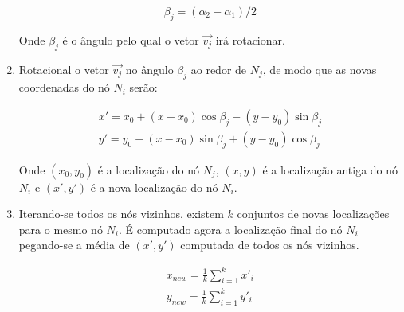 \begin{enumerate}
    \begin{equation*}
        \beta_j = (\alpha_2 - \alpha_1) / 2
    \end{equation*}

    Onde $\beta_j$ é o ângulo pelo qual o vetor $\vec{v_j}$ irá rotacionar.

    \item Rotacional o vetor $\vec{v_j}$ no ângulo $\beta_j$ ao redor de $N_j$, de modo que as novas coordenadas do nó $N_i$ serão:
    
    \begin{equation*}
    \begin{split}
        x' = x_0 + (x-x_0) \cos{\beta_j} - (y-y_0) \sin{\beta_j}\\
        y' = y_0 + (x-x_0) \sin{\beta_j} + (y-y_0) \cos{\beta_j}
    \end{split}
    \end{equation*}

    Onde $(x_0, y_0)$ é a localização do nó $N_j$, $(x,y)$ é a localização antiga do nó $N_i$ e $(x', y')$ é a nova localização do nó $N_i$.

    \item Iterando-se todos os nós vizinhos, existem $k$ conjuntos de novas localizações para o mesmo nó $N_i$. É computado agora a localização final do nó $N_i$ pegando-se a média de $(x', y')$ computada de todos os nós vizinhos.
    
    \begin{equation*}
    \begin{split}
        x_{new} = \frac{1}{k} \sum_{i=1}^k x'_i\\
        y_{new} = \frac{1}{k} \sum_{i=1}^k y'_i
    \end{split}
    \end{equation*}
\end{enumerate}

